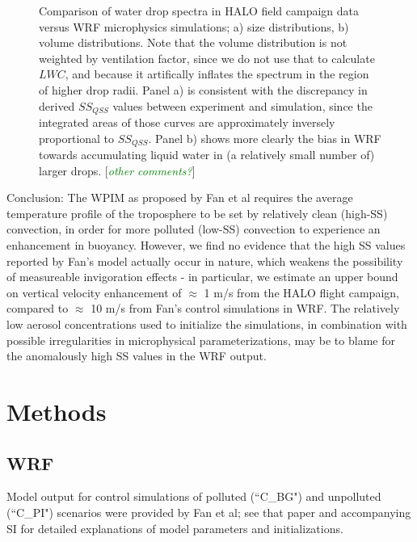 \documentclass{article}
\newcommand{\todo}[1]{\textcolor{green}{\textit{#1}}}
\begin{document}
\begin{figure}[ht]
\begin{subfigure}{0.7\textwidth}
		\label{combineddsdsmass}
		\caption{}
	\end{subfigure}
	\caption{Comparison of water drop spectra in HALO field campaign data versus WRF microphysics simulations; a) size distributions, b) volume distributions. Note that the volume distribution is not weighted by ventilation factor, since we do not use that to calculate $LWC$, and because it artifically inflates the spectrum in the region of higher drop radii. Panel a) is consistent with the discrepancy in derived $SS_{QSS}$ values between experiment and simulation, since the integrated areas of those curves are approximately inversely proportional to $SS_{QSS}$. Panel b) shows more clearly the bias in WRF towards accumulating liquid water in (a relatively small number of) larger drops. [\todo{other comments?}]}
	\label{combineddsds}
\end{figure}

Conclusion: The WPIM as proposed by Fan et al requires the average temperature profile of the troposphere to be set by relatively clean (high-SS) convection, in order for more polluted (low-SS) convection to experience an enhancement in buoyancy. However, we find no evidence that the high SS values reported by Fan's model actually occur in nature, which weakens the possibility of measureable invigoration effects - in particular, we estimate an upper bound on vertical velocity enhancement of $\approx$ 1 m/s from the HALO flight campaign, compared to $\approx$ 10 m/s from Fan's control simulations in WRF. The relatively low aerosol concentrations used to initialize the simulations, in combination with possible irregularities in microphysical parameterizations, may be to blame for the anomalously high SS values in the WRF output.

\clearpage
\newpage

\section{Methods}

\subsection{WRF}

Model output for control simulations of polluted (``C\_BG") and unpolluted (``C\_PI") scenarios were provided by Fan et al; see that paper and accompanying SI for detailed explanations of model parameters and initializations.
\end{document}
